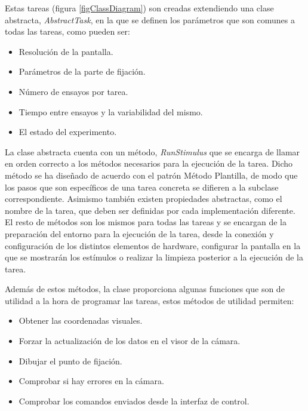 \documentclass[conference]{IEEEtran}
\begin{document}
Estas tareas (figura \ref{figClassDiagram}) son creadas extendiendo una clase abstracta, \textit{AbstractTask}, en la que se definen los parámetros que son comunes a todas las tareas, como pueden ser:

\begin{itemize}

	\item Resolución de la pantalla.
	\item Parámetros de la parte de fijación.
	\item Número de ensayos por tarea.
	\item Tiempo entre ensayos y la variabilidad del mismo.
	\item El estado del experimento.

\end{itemize}

La clase abstracta cuenta con un método, \textit{RunStimulus} que se encarga de llamar en orden correcto a los métodos necesarios para la ejecución de la tarea.
Dicho método se ha diseñado de acuerdo con el patrón Método Plantilla, de modo que los pasos que  son específicos de una tarea concreta se difieren a la subclase correspondiente.
Asimismo también existen propiedades abstractas, como el nombre de la tarea, que deben ser definidas por cada implementación diferente.
El resto de métodos son los mismos para todas las tareas y se encargan de la preparación del entorno para la ejecución de la tarea, desde la conexión y configuración de los distintos elementos de hardware, configurar la pantalla en la que se mostrarán los estímulos o realizar la limpieza posterior a la ejecución de la tarea.

Además de estos métodos, la clase proporciona algunas funciones que son de utilidad a la hora de programar las tareas, estos métodos de utilidad permiten:

\begin{itemize}
	\item Obtener las coordenadas visuales.
	\item Forzar la actualización de los datos en el visor de la cámara.
	\item Dibujar el punto de fijación.
	\item Comprobar si hay errores en la cámara.
	\item Comprobar los comandos enviados desde la interfaz de control.
\end{itemize}
\end{document}

